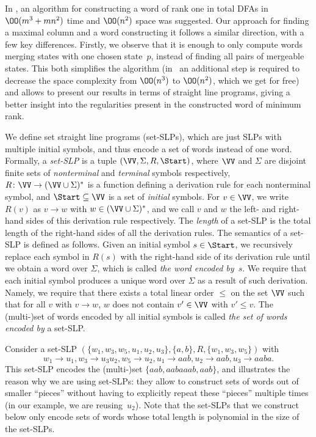 In \cite[Section 5]{Eppstein1990}, an algorithm for constructing a word of rank one in total DFAs in $\OO(m^3 + mn^2)$ time and $\OO(n^2)$ space was suggested. Our approach for finding a maximal column and a word constructing it follows a similar direction, with a few key differences. Firstly, we observe that it is enough to only compute words merging states with one chosen state~$p$, instead of finding all pairs of mergeable states. This both simplifies the algorithm (in~\cite{Eppstein1990} an additional step is required to decrease the space complexity from $\OO(n^3)$ to $\OO(n^2)$, which we get for free) and allows to present our results in terms of straight line programs, giving a better insight into the regularities present in the constructed word of minimum rank.

We define set straight line programs (set-SLPs), which are just SLPs with multiple initial symbols, and thus encode a set of words instead of one word.
Formally, a \emph{set-SLP} is a tuple $(\VV, \Sigma, R, \Start)$, where $\VV$ and $\Sigma$ are disjoint finite sets of \emph{nonterminal} and \emph{terminal} symbols respectively, $R \colon \VV \to (\VV \cup \Sigma)^*$ is a function defining a derivation rule for each nonterminal symbol, and $\Start \subseteq \VV$ is a set of \emph{initial} symbols. For $v \in \VV$, we write $R(v)$ as $v \to w$ with $w \in (\VV \cup \Sigma)^*$, and we call $v$ and $w$ the left- and right-hand sides of this derivation rule respectively. The \emph{length} of a set-SLP is the total length of the right-hand sides of all the derivation rules.
The semantics of a set-SLP is defined as follows. Given an initial symbol $s \in \Start$, we recursively replace each symbol in $R(s)$ with the right-hand side of its derivation rule until we obtain a word over $\Sigma$, which is called \emph{the word encoded by~$s$}.
We require that each initial symbol produces a unique word over $\Sigma$ as a result of such derivation. Namely, we require that there exists a total linear order $\le$ on the set $\VV$ such that for all $v$ with $v \to w$, $w$ does not contain $v' \in \VV$ with $v' \le v$. The (multi-)set of words encoded by all initial symbols is called \emph{the set of words encoded by} a set-SLP.

\begin{exa}\label{ex:set-slp}
    Consider a set-SLP $(\{w_1, w_3, w_5, u_1, u_2, u_3\}, \{a, b\}, R, \{w_1, w_3, w_5\})$ with 
\[w_1 \to u_1, w_3 \to u_3 u_2, w_5 \to u_2, 
u_1 \to aab, u_2 \to aab, u_3 \to aaba.\]
This set-SLP encodes the (multi-)set $\{aab, aabaaab, aab\}$, and illustrates the reason why we are using set-SLPs: they allow to construct sets of words out of smaller ``pieces'' without having to explicitly repeat these ``pieces'' multiple times (in our example, we are reusing~$u_2$). Note that the set-SLPs that we construct below only encode sets of words whose total length is polynomial in the size of the set-SLPs.
\end{exa}


